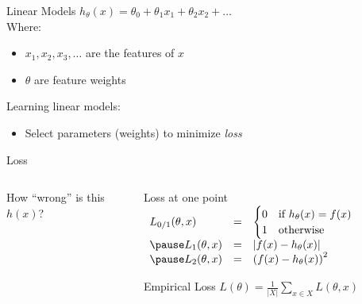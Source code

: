 \documentclass[14pt]{beamer}
\begin{document}
\begin{frame}[label=linear-models]{Linear Models}{}
{\Large$h_{\theta}(x) = \theta_0 + \theta_1 x_1 + \theta_2 x_2 + \ldots$}\\[1em]
Where:
\begin{itemize}
\item $x_1, x_2, x_3, \ldots$ are the features of $x$
\item $\theta$ are feature weights
\end{itemize}
\pause
\bigskip
Learning linear models:
\begin{itemize}
\item Select parameters (weights) to minimize \emph{loss}
\end{itemize}
\end{frame}

\begin{frame}[label=loss]{Loss}
\begin{columns}
\begin{column}{0.43\textwidth}
How ``wrong'' is this $h(x)$?\\[1em]
\end{column}
\pause
\begin{column}{0.55\textwidth}
\setlength{\arraycolsep}{0.1em}
\renewcommand{\arraystretch}{1.75}
\begin{block}{Loss at one point}
$\begin{array}{ l l l }
L_{0/1}(\theta, x) & = &
\begin{cases}
0 & \text{if } h_{\theta}(x) = f(x) \\
1 & \text{otherwise}
\end{cases}
\\
\pause L_1(\theta, x) & = & \left| f(x) - h_{\theta}(x) \right| \\
\pause L_2(\theta, x) & = & \left( f(x) - h_{\theta}(x) \right)^2
\end{array}$
\end{block}
\pause
\begin{block}{Empirical Loss}
$\displaystyle L(\theta) = \frac{1}{|X|} \sum_{x \in X} L(\theta, x)$
\end{block}
\end{column}
\end{columns}
\end{frame}
\end{document}
